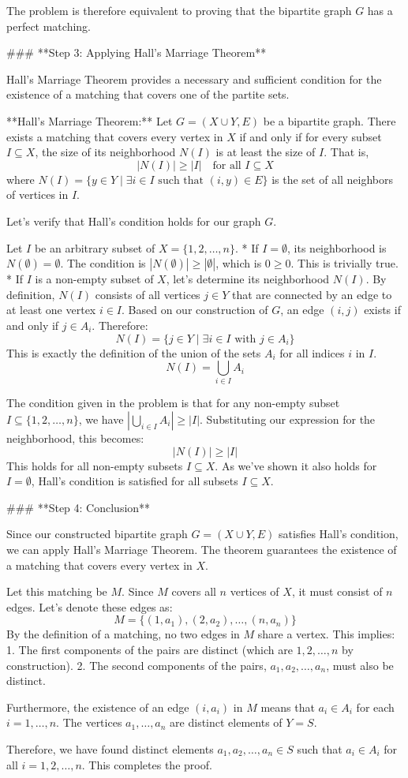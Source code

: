 The problem is therefore equivalent to proving that the bipartite graph $G$ has a perfect matching.

### **Step 3: Applying Hall's Marriage Theorem**

Hall's Marriage Theorem provides a necessary and sufficient condition for the existence of a matching that covers one of the partite sets.

**Hall's Marriage Theorem:** Let $G=(X \cup Y, E)$ be a bipartite graph. There exists a matching that covers every vertex in $X$ if and only if for every subset $I \subseteq X$, the size of its neighborhood $N(I)$ is at least the size of $I$. That is,
$$|N(I)| \ge |I| \quad \text{for all } I \subseteq X$$
where $N(I) = \{y \in Y \mid \exists i \in I \text{ such that } (i,y) \in E\}$ is the set of all neighbors of vertices in $I$.

Let's verify that Hall's condition holds for our graph $G$.

Let $I$ be an arbitrary subset of $X = \{1, 2, \dots, n\}$.
*   If $I = \emptyset$, its neighborhood is $N(\emptyset) = \emptyset$. The condition is $|N(\emptyset)| \ge |\emptyset|$, which is $0 \ge 0$. This is trivially true.
*   If $I$ is a non-empty subset of $X$, let's determine its neighborhood $N(I)$. By definition, $N(I)$ consists of all vertices $j \in Y$ that are connected by an edge to at least one vertex $i \in I$. Based on our construction of $G$, an edge $(i, j)$ exists if and only if $j \in A_i$. Therefore:
    $$N(I) = \{j \in Y \mid \exists i \in I \text{ with } j \in A_i\}$$
    This is exactly the definition of the union of the sets $A_i$ for all indices $i$ in $I$.
    $$N(I) = \bigcup_{i \in I} A_i$$

The condition given in the problem is that for any non-empty subset $I \subseteq \{1, 2, \dots, n\}$, we have $|\bigcup_{i \in I} A_i| \ge |I|$. Substituting our expression for the neighborhood, this becomes:
$$|N(I)| \ge |I|$$
This holds for all non-empty subsets $I \subseteq X$. As we've shown it also holds for $I=\emptyset$, Hall's condition is satisfied for all subsets $I \subseteq X$.

### **Step 4: Conclusion**

Since our constructed bipartite graph $G=(X \cup Y, E)$ satisfies Hall's condition, we can apply Hall's Marriage Theorem. The theorem guarantees the existence of a matching that covers every vertex in $X$.

Let this matching be $M$. Since $M$ covers all $n$ vertices of $X$, it must consist of $n$ edges. Let's denote these edges as:
$$M = \{ (1, a_1), (2, a_2), \dots, (n, a_n) \}$$
By the definition of a matching, no two edges in $M$ share a vertex. This implies:
1.  The first components of the pairs are distinct (which are $1, 2, \dots, n$ by construction).
2.  The second components of the pairs, $a_1, a_2, \dots, a_n$, must also be distinct.

Furthermore, the existence of an edge $(i, a_i)$ in $M$ means that $a_i \in A_i$ for each $i=1, \dots, n$. The vertices $a_1, \dots, a_n$ are distinct elements of $Y=S$.

Therefore, we have found distinct elements $a_1, a_2, \dots, a_n \in S$ such that $a_i \in A_i$ for all $i = 1, 2, \dots, n$. This completes the proof.
